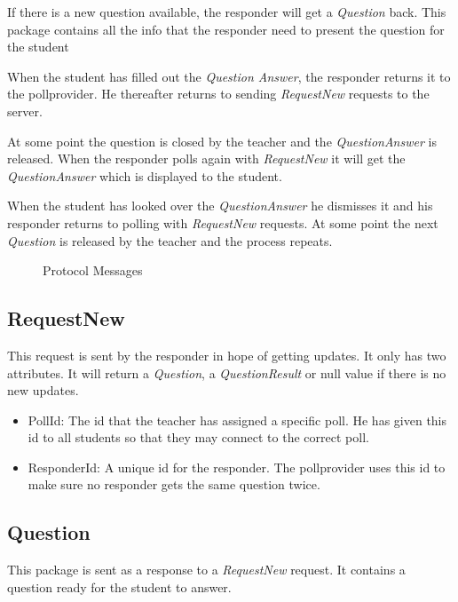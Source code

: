 \documentclass{acm_proc_article-sp}
\begin{document}
If there is a new question available, the responder will get a \emph{Question} back.
This package contains all the info that the responder need to present the question for the student

When the student has filled out the \emph{Question Answer}, the responder returns it to the pollprovider.
He thereafter returns to sending \emph{RequestNew} requests to the server.

At some point the question is closed by the teacher and the \emph{QuestionAnswer} is released.
When the responder polls again with \emph{RequestNew} it will get the \emph{QuestionAnswer} which is displayed to the student.

When the student has looked over the \emph{QuestionAnswer} he dismisses it and his responder returns to polling with
\emph{RequestNew} requests. At some point the next \emph{Question} is released by the teacher and the process repeats.


\begin{figure}[h]
\centering
{}
\caption{Protocol Messages}
\label{fig:ProtocolMessages}
\end{figure}

\subsection{RequestNew}
This request is sent by the responder in hope of getting updates. It only has two attributes.
It will return a \emph{Question}, a \emph{QuestionResult} or null value if there is no new updates.

\begin{itemize}
\item PollId: The id that the teacher has assigned a specific poll. He has given this id to all students so that they may connect to the correct poll.
\item ResponderId: A unique id for the responder. The pollprovider uses this id to make sure no responder gets the same question twice.
\end{itemize}


\subsection{Question}
This package is sent as a response to a \emph{RequestNew} request. It contains a question ready for the student to answer.
\end{document}
